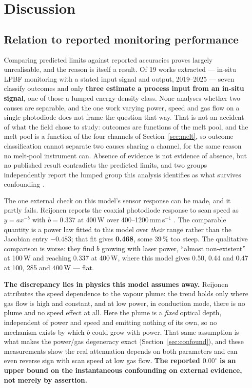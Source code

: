 \documentclass[final,5p,times,twocolumn]{elsarticle}
\begin{document}
\section{Discussion}

\subsection{Relation to reported monitoring performance}

Comparing predicted limits against reported accuracies proves largely
unrealisable, and the reason is itself a result. Of 19 works extracted --- in-situ
LPBF monitoring with a stated input signal and output, 2019--2025 --- seven
classify outcomes and only \textbf{three estimate a process input from an in-situ
signal}, one of those a lumped energy-density class. None analyses whether two
causes are separable, and the one work varying power, speed and gas flow on a
single photodiode \cite{Reijonen2024} does not frame the question that way. That is not an accident of what the field chose
to study: outcomes are functions of the melt pool, and the melt pool is a
function of the four channels of Section~\ref{sec:melt}, so outcome
classification cannot separate two causes sharing a channel, for the same reason
no melt-pool instrument can. Absence of evidence is not evidence of absence, but
no published result contradicts the predicted limits, and two groups
independently report the lumped group this analysis identifies as what survives
confounding \cite{Blanc2024,kNN2025}.

The one external check on this model's sensor response can be made, and it
partly fails. Reijonen reports the coaxial photodiode response to scan speed as
$y=ax^{-b}$ with $b=0.337$ at 400\,W over 400--1200\,mm\,s$^{-1}$
\cite{Reijonen2024}. The comparable quantity is a power law fitted to this model
over \emph{their} range rather than the Jacobian entry $-0.483$; that fit gives
\textbf{0.468}, some 39\,\% too steep. The qualitative comparison is worse: they
find $b$ growing with laser power, ``almost non-existent'' at 100\,W and
reaching 0.337 at 400\,W, where this model gives 0.50, 0.44 and 0.47 at 100, 285
and 400\,W --- flat.

\textbf{The discrepancy lies in physics this model assumes away.} Reijonen
attributes the speed dependence to the vapour plume: the trend holds only where
gas flow is high and constant, and at low power, in conduction mode, there is no
plume and no speed effect at all. Here the plume is a \emph{fixed} optical depth,
independent of power and speed and emitting nothing of its own, so no mechanism
exists by which $b$ could grow with power. That same assumption is what makes
the power/gas degeneracy exact (Section~\ref{sec:confound}), and these
measurements show the real attenuation depends on both parameters and can even
reverse sign with scan speed at low gas flow. \textbf{The reported $0.00^\circ$
is an upper bound on the instantaneous confounding on external evidence, not
merely by assertion.}
\end{document}
